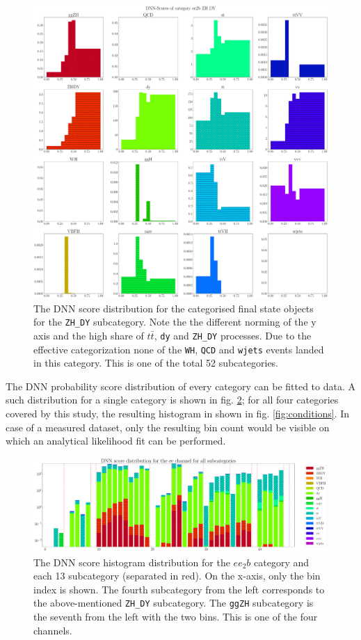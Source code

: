 \begin{figure}[h!]
	\centering
	\includegraphics[width=\linewidth]{figures/analysis/ee_2b_dnn_node_ZH_DY.pdf}
	\caption{The DNN score distribution for the categorised final state objects for the \texttt{ZH\_DY} subcategory. Note the the different norming of the y axis and the high share of $t\bar{t}$, \texttt{dy} and \texttt{ZH\_DY} processes. Due to the effective categorization none of the \texttt{WH}, \texttt{QCD} and \texttt{wjets} events landed in this category. This is one of the total 52 subcategories.}
	\label{fig:ZH_DY_sub}
\end{figure}

The DNN probability score distribution of every category can be fitted to data. A such distribution for a single category is shown in fig. \ref{fig:ee_dnn_score}; for all four categories covered by this study, the resulting histogram in shown in fig. \ref{fig:conditions}. In case of a measured dataset, only the resulting bin count would be visible on which an analytical likelihood fit can be performed.

\begin{figure}[h!]
	\centering
	\includegraphics[width=\linewidth]{figures/analysis/cond1.pdf}
	\caption{The DNN score histogram distribution for the $ee_2b$ category and each 13 subcategory (separated in red). On the x-axis, only the bin index is shown. The fourth subcategory from the left corresponds to the above-mentioned \texttt{ZH\_DY} subcategory. The \texttt{ggZH} subcategory is the seventh from the left with the two bins. This is one of the four channels.}
	\label{fig:ee_dnn_score}
\end{figure}


